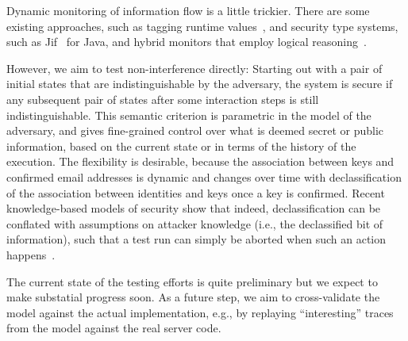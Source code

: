 \documentclass{llncs}
\begin{document}
Dynamic monitoring of information flow is a little trickier.
There are some existing approaches, such as tagging runtime values~\cite{austin2009efficient},
and security type systems, such as Jif~\cite{myers2001jif} for Java,
and hybrid monitors that employ logical reasoning~\cite{chudnov2014information}.

However, we aim to test non-interference directly:
Starting out with a pair of initial states that are indistinguishable by the adversary,
the system is secure if any subsequent pair of states after some interaction steps is still indistinguishable.
This semantic criterion is parametric in the model of the adversary, and gives fine-grained control over what is deemed secret or public information, based on the current state or in terms of the history of the execution.
The flexibility is desirable, because the association between keys and confirmed email addresses is dynamic and changes over time with declassification of the association between identities and keys once a key is confirmed.
Recent knowledge-based models of security show that indeed, declassification can be conflated with assumptions on attacker knowledge (i.e., the declassified bit of information),
such that a test run can simply be aborted when such an action happens~\cite{chudnov2018assuming}.

The current state of the testing efforts is quite preliminary but we expect to make substatial progress soon.
As a future step, we aim to cross-validate the model against the actual implementation,
e.g., by replaying ``interesting'' traces from the model against the real server code.



\end{document}
